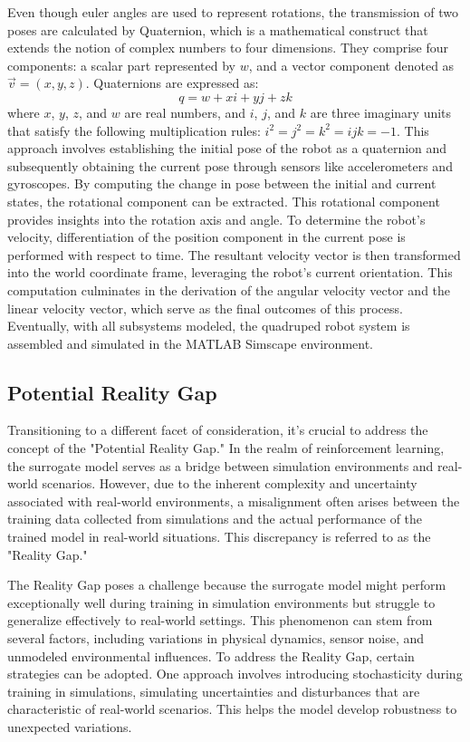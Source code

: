 Even though euler angles are used to represent rotations, the transmission of two poses are calculated by Quaternion, which is a mathematical construct that extends the notion of complex numbers to four dimensions. They comprise four components: a scalar part represented by $w$, and a vector component denoted as $\vec{v}=(x, y, z)$. Quaternions are expressed as:
$$q = w + xi + yj + zk$$
where $x$, $y$, $z$, and $w$ are real numbers, and $i$, $j$, and $k$ are three imaginary units that satisfy the following multiplication rules: $i^2 = j^2 = k^2 = ijk = -1$. This approach involves establishing the initial pose of the robot as a quaternion and subsequently obtaining the current pose through sensors like accelerometers and gyroscopes. By computing the change in pose between the initial and current states, the rotational component can be extracted. This rotational component provides insights into the rotation axis and angle. To determine the robot's velocity, differentiation of the position component in the current pose is performed with respect to time. The resultant velocity vector is then transformed into the world coordinate frame, leveraging the robot's current orientation. This computation culminates in the derivation of the angular velocity vector and the linear velocity vector, which serve as the final outcomes of this process. Eventually, with all subsystems modeled, the quadruped robot system is assembled and simulated in the MATLAB Simscape environment.

\subsection{Potential Reality Gap}
Transitioning to a different facet of consideration, it's crucial to address the concept of the "Potential Reality Gap." In the realm of reinforcement learning, the surrogate model serves as a bridge between simulation environments and real-world scenarios. However, due to the inherent complexity and uncertainty associated with real-world environments, a misalignment often arises between the training data collected from simulations and the actual performance of the trained model in real-world situations. This discrepancy is referred to as the "Reality Gap."

The Reality Gap poses a challenge because the surrogate model might perform exceptionally well during training in simulation environments but struggle to generalize effectively to real-world settings. This phenomenon can stem from several factors, including variations in physical dynamics, sensor noise, and unmodeled environmental influences. To address the Reality Gap, certain strategies can be adopted. One approach involves introducing stochasticity during training in simulations, simulating uncertainties and disturbances that are characteristic of real-world scenarios. This helps the model develop robustness to unexpected variations.